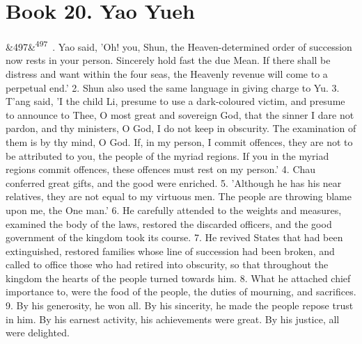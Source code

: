 \documentclass[12pt]{article}
\newcommand{\para}[1][]{\par\noindent\ifx&#1&\else\textsuperscript{\footnotesize #1}~\fi}
\begin{document}
\section*{Book 20. Yao Yueh}

\para[497] 1. Yao said, 'Oh! you, Shun, the Heaven-determined order of succession now rests in your person. Sincerely hold fast the due Mean. If there shall be distress and want within the four seas, the Heavenly revenue will come to a perpetual end.' 2. Shun also used the same language in giving charge to Yu. 3. T'ang said, 'I the child Li, presume to use a dark-coloured victim, and presume to announce to Thee, O most great and sovereign God, that the sinner I dare not pardon, and thy ministers, O God, I do not keep in obscurity. The examination of them is by thy mind, O God. If, in my person, I commit offences, they are not to be attributed to you, the people of the myriad regions. If you in the myriad regions commit offences, these offences must rest on my person.' 4. Chau conferred great gifts, and the good were enriched. 5. 'Although he has his near relatives, they are not equal to my virtuous men. The people are throwing blame upon me, the One man.' 6. He carefully attended to the weights and measures, examined the body of the laws, restored the discarded officers, and the good government of the kingdom took its course. 7. He revived States that had been extinguished, restored families whose line of succession had been broken, and called to office those who had retired into obscurity, so that throughout the kingdom the hearts of the people turned towards him. 8. What he attached chief importance to, were the food of the people, the duties of mourning, and sacrifices. 9. By his generosity, he won all. By his sincerity, he made the people repose trust in him. By his earnest activity, his achievements were great. By his justice, all were delighted.
\end{document}
